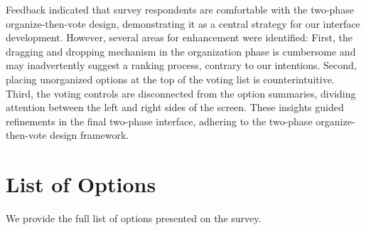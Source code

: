 Feedback indicated that survey respondents are comfortable with the two-phase organize-then-vote design, demonstrating it as a central strategy for our interface development. However, several areas for enhancement were identified: First, the dragging and dropping mechanism in the organization phase is cumbersome and may inadvertently suggest a ranking process, contrary to our intentions. Second, placing unorganized options at the top of the voting list is counterintuitive. Third, the voting controls are disconnected from the option summaries, dividing attention between the left and right sides of the screen. These insights guided refinements in the final two-phase interface, adhering to the two-phase organize-then-vote design framework.



\section{List of Options}
\label{sec:charityList}
We provide the full list of options presented on the survey.

